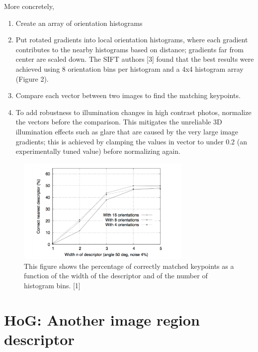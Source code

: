 \documentclass{article}
\begin{document}
More concretely,
\begin{enumerate}
  \item Create an array of orientation histograms
  \item Put rotated gradients into local orientation histograms, where each gradient contributes to the nearby histograms based on distance; gradients far from center are scaled down. The SIFT authors [3] found that the best results	were achieved using 8 orientation bins per histogram and a 4x4 histogram array (Figure 2).
  \item Compare each vector between two images to find the matching keypoints.
  \item To add robustness to illumination changes in high contrast photos, normalize the vectors before the comparison. This mitigates the unreliable 3D illumination effects such as glare that are caused by the very large image gradients; this is achieved by clamping the values in vector to under 0.2 (an experimentally tuned value) before normalizing again.
\end{enumerate}

\begin{figure}[h]
  \centering
  \includegraphics[width=0.75\textwidth]{histogramsensitivity}
  \caption{This figure shows the percentage of correctly matched keypoints as a function of the width of the descriptor and of the number of histogram bins. [1]}
\end{figure}


\section{HoG: Another image region descriptor}
\end{document}
